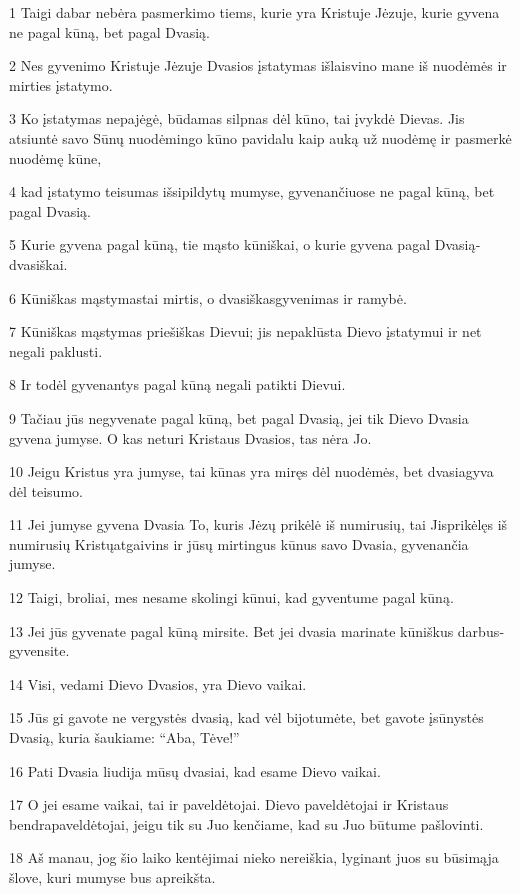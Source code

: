 \par 1 Taigi dabar nebėra pasmerkimo tiems, kurie yra Kristuje Jėzuje, kurie gyvena ne pagal kūną, bet pagal Dvasią. 
\par 2 Nes gyvenimo Kristuje Jėzuje Dvasios įstatymas išlaisvino mane iš nuodėmės ir mirties įstatymo. 
\par 3 Ko įstatymas nepajėgė, būdamas silpnas dėl kūno, tai įvykdė Dievas. Jis atsiuntė savo Sūnų nuodėmingo kūno pavidalu kaip auką už nuodėmę ir pasmerkė nuodėmę kūne, 
\par 4 kad įstatymo teisumas išsipildytų mumyse, gyvenančiuose ne pagal kūną, bet pagal Dvasią. 
\par 5 Kurie gyvena pagal kūną, tie mąsto kūniškai, o kurie gyvena pagal Dvasią­dvasiškai. 
\par 6 Kūniškas mąstymas­tai mirtis, o dvasiškas­gyvenimas ir ramybė. 
\par 7 Kūniškas mąstymas priešiškas Dievui; jis nepaklūsta Dievo įstatymui ir net negali paklusti. 
\par 8 Ir todėl gyvenantys pagal kūną negali patikti Dievui. 
\par 9 Tačiau jūs negyvenate pagal kūną, bet pagal Dvasią, jei tik Dievo Dvasia gyvena jumyse. O kas neturi Kristaus Dvasios, tas nėra Jo. 
\par 10 Jeigu Kristus yra jumyse, tai kūnas yra miręs dėl nuodėmės, bet dvasia­gyva dėl teisumo. 
\par 11 Jei jumyse gyvena Dvasia To, kuris Jėzų prikėlė iš numirusių, tai Jis­prikėlęs iš numirusių Kristų­atgaivins ir jūsų mirtingus kūnus savo Dvasia, gyvenančia jumyse. 
\par 12 Taigi, broliai, mes nesame skolingi kūnui, kad gyventume pagal kūną. 
\par 13 Jei jūs gyvenate pagal kūną­ mirsite. Bet jei dvasia marinate kūniškus darbus­gyvensite. 
\par 14 Visi, vedami Dievo Dvasios, yra Dievo vaikai. 
\par 15 Jūs gi gavote ne vergystės dvasią, kad vėl bijotumėte, bet gavote įsūnystės Dvasią, kuria šaukiame: “Aba, Tėve!” 
\par 16 Pati Dvasia liudija mūsų dvasiai, kad esame Dievo vaikai. 
\par 17 O jei esame vaikai, tai ir paveldėtojai. Dievo paveldėtojai ir Kristaus bendrapaveldėtojai, jeigu tik su Juo kenčiame, kad su Juo būtume pašlovinti. 
\par 18 Aš manau, jog šio laiko kentėjimai nieko nereiškia, lyginant juos su būsimąja šlove, kuri mumyse bus apreikšta. 
